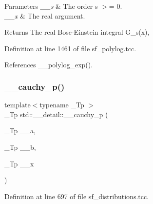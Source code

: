 \begin{DoxyParams}{Parameters}
{\em \+\_\+\+\_\+s} & The order s $>$= 0. \\
\hline
{\em \+\_\+\+\_\+x} & The real argument. \\
\hline
\end{DoxyParams}
\begin{DoxyReturn}{Returns}
The real Bose-\/\+Einstein integral G\+\_\+s(x), 
\end{DoxyReturn}


Definition at line 1461 of file sf\+\_\+polylog.\+tcc.



References \+\_\+\+\_\+polylog\+\_\+exp().

\mbox{\label{namespacestd_1_1____detail_ac92c91623b3e41c6384c977d5ec594e7}} 
\subsubsection{\texorpdfstring{\+\_\+\+\_\+cauchy\+\_\+p()}{\_\_cauchy\_p()}}
{\footnotesize\ttfamily template$<$typename \+\_\+\+Tp $>$ \\
\+\_\+\+Tp std\+::\+\_\+\+\_\+detail\+::\+\_\+\+\_\+cauchy\+\_\+p (\begin{DoxyParamCaption}\item[{\+\_\+\+Tp}]{\+\_\+\+\_\+a,  }\item[{\+\_\+\+Tp}]{\+\_\+\+\_\+b,  }\item[{\+\_\+\+Tp}]{\+\_\+\+\_\+x }\end{DoxyParamCaption})}



Definition at line 697 of file sf\+\_\+distributions.\+tcc.

\mbox{\label{namespacestd_1_1____detail_a5fa9d67b4e0af4e0e018a06d198f0280}} 
